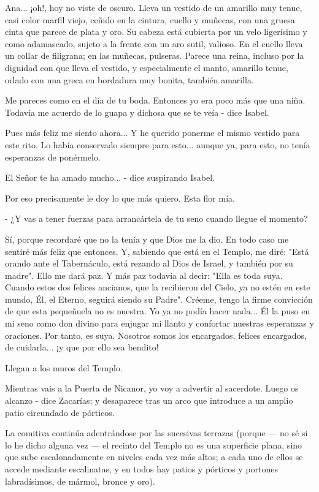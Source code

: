 \documentclass[12pt, twoside, openright]{book} %
\begin{document}
Ana... ¡oh!, hoy no viste de oscuro. Lleva un vestido de un amarillo muy tenue, casi color marfil viejo, ceñido en la cintura, cuello y muñecas, con una gruesa cinta que parece de plata y oro. Su cabeza está cubierta por un velo ligerísimo y como adamascado, sujeto a la frente con un aro sutil, valioso. En el cuello lleva un collar de filigrana; en las muñecas, pulseras. Parece una reina, incluso por la dignidad con que lleva el vestido, y especialmente el manto, amarillo tenue, orlado con una greca en bordadura muy bonita, también amarilla. 

Me pareces como en el día de tu boda. Entonces yo era poco más que una niña. Todavía me acuerdo de lo guapa y dichosa que se te veía - dice Isabel. 

Pues más feliz me siento ahora... Y he querido ponerme el mismo vestido para este rito. Lo había conservado siempre para esto... aunque ya, para esto, no tenía esperanzas de ponérmelo. 

El Señor te ha amado mucho... - dice suspirando Isabel. 

Por eso precisamente le doy lo que más quiero. Esta flor mía. 

- ¿Y vas a tener fuerzas para arrancártela de tu seno cuando llegue el momento? 

Sí, porque recordaré que no la tenía y que Dios me la dio. En todo caso me sentiré más feliz que entonces. Y, sabiendo que está en el Templo, me diré: "Está orando ante el Tabernáculo, está rezando al Dios de Israel, y también por su madre". Ello me dará paz. Y más paz todavía al decir: "Ella es toda suya. Cuando estos dos felices ancianos, que la recibieron del Cielo, ya no estén en este mundo, Él, el Eterno, seguirá siendo su Padre". Créeme, tengo la firme convicción de que esta pequeñuela no es nuestra. Yo ya no podía hacer nada... Él la puso en mi seno como don divino para enjugar mi llanto y confortar nuestras esperanzas y oraciones. Por tanto, es suya. Nosotros somos los encargados, felices encargados, de cuidarla... ¡y que por ello sea bendito! 

Llegan a los muros del Templo. 
 
Mientras vais a la Puerta de Nicanor, yo voy a advertir al sacerdote. Luego os alcanzo - dice Zacarías; y desaparece tras un arco que introduce a un amplio patio circundado de pórticos. 

La comitiva continúa adentrándose por las sucesivas terrazas (porque — no sé si lo he dicho alguna vez — el recinto del Templo no es una superficie plana, sino que sube escalonadamente en niveles cada vez más altos; a cada uno de ellos se accede mediante escalinatas, y en todos hay patios y pórticos y portones labradísimos, de mármol, bronce y oro). 
\end{document}
